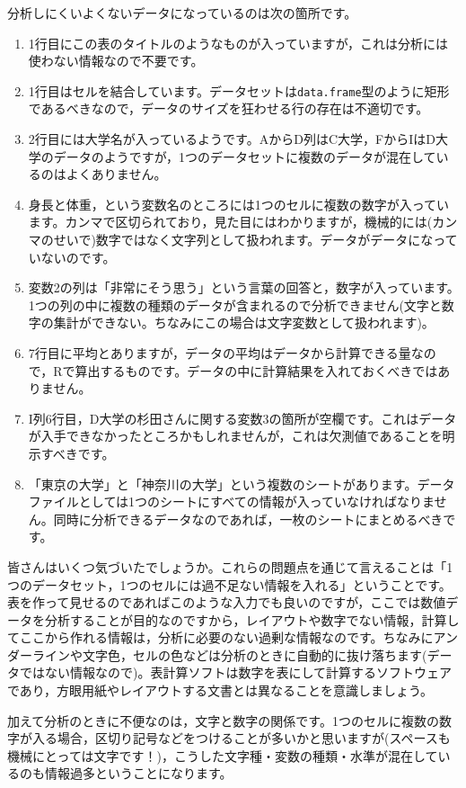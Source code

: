 分析しにくいよくないデータになっているのは次の箇所です。
\begin{enumerate}
	\item 1行目にこの表のタイトルのようなものが入っていますが，これは分析には使わない情報なので不要です。
	\item 1行目はセルを結合しています。データセットは\texttt{data.frame}型のように矩形であるべきなので，データのサイズを狂わせる行の存在は不適切です。
	\item 2行目には大学名が入っているようです。AからD列はC大学，FからIはD大学のデータのようですが，1つのデータセットに複数のデータが混在しているのはよくありません。
	\item 身長と体重，という変数名のところには1つのセルに複数の数字が入っています。カンマで区切られており，見た目にはわかりますが，機械的には(カンマのせいで)数字ではなく文字列として扱われます。データがデータになっていないのです。
	\item 変数2の列は「非常にそう思う」という言葉の回答と，数字が入っています。1つの列の中に複数の種類のデータが含まれるので分析できません(文字と数字の集計ができない。ちなみにこの場合は文字変数として扱われます)。
	\item 7行目に平均とありますが，データの平均はデータから計算できる量なので，Rで算出するものです。データの中に計算結果を入れておくべきではありません。
	\item I列6行目，D大学の杉田さんに関する変数3の箇所が空欄です。これはデータが入手できなかったところかもしれませんが，これは欠測値であることを明示すべきです。
	\item 「東京の大学」と「神奈川の大学」という複数のシートがあります。データファイルとしては1つのシートにすべての情報が入っていなければなりません。同時に分析できるデータなのであれば，一枚のシートにまとめるべきです。
\end{enumerate}
皆さんはいくつ気づいたでしょうか。これらの問題点を通じて言えることは「1つのデータセット，1つのセルには過不足ない情報を入れる」ということです。表を作って見せるのであればこのような入力でも良いのですが，ここでは数値データを分析することが目的なのですから，レイアウトや数字でない情報，計算してここから作れる情報は，分析に必要のない過剰な情報なのです。ちなみにアンダーラインや文字色，セルの色などは分析のときに自動的に抜け落ちます(データではない情報なので)。表計算ソフトは数字を表にして計算するソフトウェアであり，方眼用紙やレイアウトする文書とは異なることを意識しましょう。

加えて分析のときに不便なのは，文字と数字の関係です。1つのセルに複数の数字が入る場合，区切り記号などをつけることが多いかと思いますが(スペースも機械にとっては文字です！)，こうした文字種・変数の種類・水準が混在しているのも情報過多ということになります。

